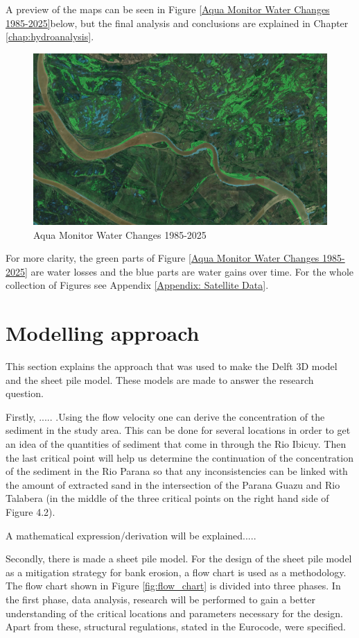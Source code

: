 A preview of the maps can be seen in Figure \ref{Aqua Monitor Water Changes 1985-2025}below, but the final analysis and conclusions are explained in Chapter \ref{chap:hydroanalysis}. 

\begin{figure}[H]
    \centering
    \includegraphics[width=0.75\linewidth]{figures/ch4/1985-2025.jpg}
    \caption{Aqua Monitor Water Changes 1985-2025}
\end{figure}
\label{Aqua Monitor Water Changes 1985-2025}

For more clarity, the green parts of Figure \ref{Aqua Monitor Water Changes 1985-2025} are water losses and the blue parts are water gains over time. For the whole collection of Figures see Appendix \ref{Appendix: Satellite Data}.

\section{Modelling approach}
This section explains the approach that was used to make the Delft 3D model and the sheet pile model. These models are made to answer the research question. 

Firstly, ..... .Using the flow velocity one can derive the concentration of the sediment in the study area. This can be done for several locations in order to get an idea of the quantities of sediment that come in through the Rio Ibicuy. Then the last critical point will help us determine the continuation of the concentration of the sediment in the Rio Parana so that any inconsistencies can be linked with the amount of extracted sand in the intersection of the Parana Guazu and Rio Talabera (in the middle of the three critical points on the right hand side of Figure 4.2).

A mathematical expression/derivation will be explained.....

Secondly, there is made a sheet pile model. For the design of the sheet pile model as a mitigation strategy for bank erosion, a flow chart is used as a methodology. The flow chart shown in Figure \ref{fig:flow_chart} is divided into three phases. In the first phase, data analysis, research will be performed to gain a better understanding of the critical locations and parameters necessary for the design. Apart from these, structural regulations, stated in the Eurocode, were specified. 

